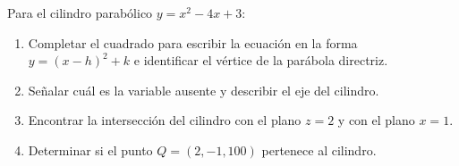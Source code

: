 Para el cilindro parabólico $y = x^2 - 4x + 3$:
\begin{enumerate}
    \item Completar el cuadrado para escribir la ecuación en la forma $y = (x - h)^2 + k$ e identificar el vértice de la parábola directriz.
    \item Señalar cuál es la variable ausente y describir el eje del cilindro.
    \item Encontrar la intersección del cilindro con el plano $z = 2$ y con el plano $x = 1$.
    \item Determinar si el punto $Q = (2, -1, 100)$ pertenece al cilindro.
\end{enumerate}
